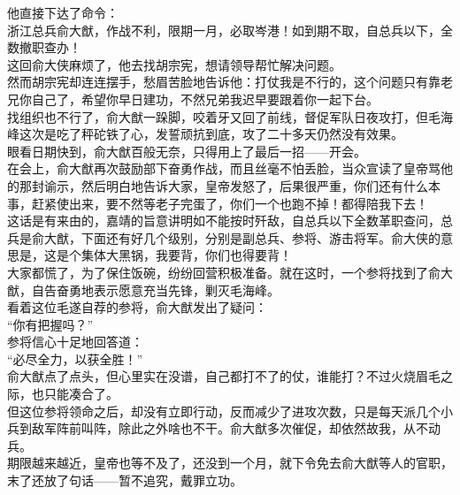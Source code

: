 \begin{multicols}{\theparacolNo}
他直接下达了命令：\\

浙江总兵俞大猷，作战不利，限期一月，必取岑港！如到期不取，自总兵以下，全数撤职查办！\\

这回俞大侠麻烦了，他去找胡宗宪，想请领导帮忙解决问题。\\

然而胡宗宪却连连摆手，愁眉苦脸地告诉他：打仗我是不行的，这个问题只有靠老兄你自己了，希望你早日建功，不然兄弟我迟早要跟着你一起下台。\\

找组织也不行了，俞大猷一跺脚，咬着牙又回了前线，督促军队日夜攻打，但毛海峰这次是吃了秤砣铁了心，发誓顽抗到底，攻了二十多天仍然没有效果。\\

眼看日期快到，俞大猷百般无奈，只得用上了最后一招——开会。\\

在会上，俞大猷再次鼓励部下奋勇作战，而且丝毫不怕丢脸，当众宣读了皇帝骂他的那封谕示，然后明白地告诉大家，皇帝发怒了，后果很严重，你们还有什么本事，赶紧使出来，要不然等老子完蛋了，你们一个也跑不掉！都得陪我下去！\\

这话是有来由的，嘉靖的旨意讲明如不能按时歼敌，自总兵以下全数革职查问，总兵是俞大猷，下面还有好几个级别，分别是副总兵、参将、游击将军。俞大侠的意思是，这是个集体大黑锅，我要背，你们也得要背！\\

大家都慌了，为了保住饭碗，纷纷回营积极准备。就在这时，一个参将找到了俞大猷，自告奋勇地表示愿意充当先锋，剿灭毛海峰。\\

看着这位毛遂自荐的参将，俞大猷发出了疑问：\\

“你有把握吗？”\\

参将信心十足地回答道：\\

“必尽全力，以获全胜！”\\

俞大猷点了点头，但心里实在没谱，自己都打不了的仗，谁能打？不过火烧眉毛之际，也只能凑合了。\\

但这位参将领命之后，却没有立即行动，反而减少了进攻次数，只是每天派几个小兵到敌军阵前叫阵，除此之外啥也不干。俞大猷多次催促，却依然故我，从不动兵。\\

期限越来越近，皇帝也等不及了，还没到一个月，就下令免去俞大猷等人的官职，末了还放了句话——暂不追究，戴罪立功。\\


\end{multicols}
